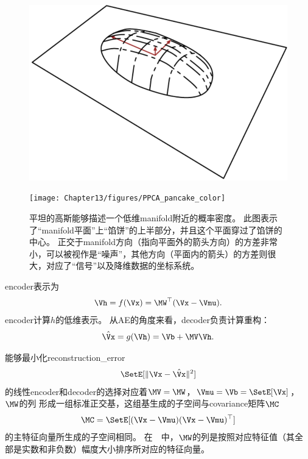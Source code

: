 \begin{figure}[!htb]
\ifOpenSource
\centerline{\includegraphics[scale=0.5]{images/117.png}}
\else
	\centerline{\texttt{[image: Chapter13/figures/PPCA\_pancake\_color]}}
\fi
\caption{平坦的高斯能够描述一个低维\gls{manifold}附近的概率密度。
此图表示了``\gls{manifold}平面''上``馅饼''的上半部分，并且这个平面穿过了馅饼的中心。
正交于\gls{manifold}方向（指向平面外的箭头方向）的方差非常小，可以被视作是``噪声''，其他方向（平面内的箭头）的方差则很大，对应了``信号''以及降维数据的坐标系统。}
\label{fig:PPCA_pancake}
\end{figure}


\gls{encoder}表示为
\begin{align}
\label{eqn:1319}
\Vh  = f(\Vx) = \MW^{\top} (\Vx - \Vmu).
\end{align}%
\gls{encoder}计算$h$的低维表示。
从\gls{AE}的角度来看，\gls{decoder}负责计算重构：
\begin{align}
\label{eqn:1320}
\hat{\Vx} = g(\Vh) = \Vb + \MV \Vh.
\end{align}


能够最小化\gls{reconstruction_error}
\begin{align}
\label{eqn:1321}
\SetE[\Vert\Vx - \hat{\Vx}\Vert^2]
\end{align}
的线性\gls{encoder}和\gls{decoder}的选择对应着$\MV = \MW$，${\Vmu} = \Vb = \SetE[\Vx]$， $\MW$的列 形成一组标准正交基，这组基生成的子空间与\gls{covariance}矩阵$\MC$
\begin{align}
\label{eqn:1322}
\MC = \SetE[(\Vx - {\Vmu})(\Vx - {\Vmu})^{\top}]
\end{align}
的主特征向量所生成的子空间相同。
在~~中，$\MW$的列是按照对应特征值（其全部是实数和非负数）幅度大小排序所对应的特征向量。

